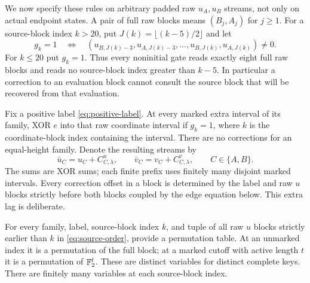 We now specify these rules on arbitrary padded raw $u_A,u_B$ streams,
not only on actual endpoint states.  A pair of full raw blocks means
$(B_j,A_j)$ for $j\ge1$.  For a source-block index $k>20$, put
$J(k)=\lfloor(k-5)/2\rfloor$ and let
\begin{equation}\label{eq:lag-gate}
 g_k=1\quad\Longleftrightarrow\quad
 (u_{B,J(k)-3},u_{A,J(k)-3},\ldots,
   u_{B,J(k)},u_{A,J(k)})\ne0.
\end{equation}
For $k\le20$ put $g_k=1$.  Thus every noninitial gate reads exactly
eight full raw blocks and reads no source-block index greater than
$k-5$.  In particular a correction to an evaluation block cannot
consult the source block that will be recovered from that evaluation.

Fix a positive label \eqref{eq:positive-label}.  At every marked extra
interval of its family, XOR $e$ into that raw coordinate interval if
$g_k=1$, where $k$ is the coordinate-block index containing the interval.
There are no corrections for an equal-height family.  Denote the resulting
streams by
\begin{equation}\label{eq:corrected-streams}
 \bar u_C=u_C+C^u_{C,\lambda},\qquad
 \bar v_C=v_C+C^v_{C,\lambda},\qquad C\in\{A,B\}.
\end{equation}
The sums are XOR sums; each finite prefix uses finitely many disjoint
marked intervals.  Every correction offset in a block is determined by
the label and raw $u$ blocks strictly before both blocks coupled by the
edge equation below.  This extra lag is deliberate.

For every family, label, source-block index $k$, and tuple of all raw $u$
blocks strictly earlier than $k$ in \eqref{eq:source-order}, provide a
permutation table.  At an unmarked index it is a permutation of the full
block; at a marked cutoff with active length $t$ it is a permutation of
$\mathbb F_2^t$.  These are distinct variables for distinct complete keys.  There
are finitely many variables at each source-block index.

